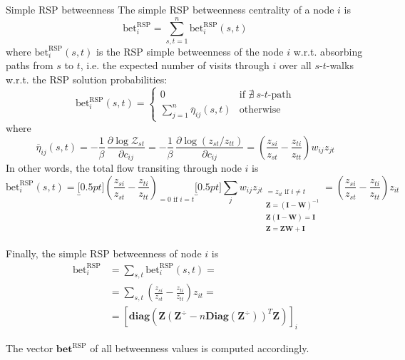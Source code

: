 \documentclass[13pt]{beamer}
\begin{document}
    \begin{frame}[t,allowframebreaks]{Simple RSP betweenness}
    The simple RSP betweenness centrality of a node $i$ is
    \begin{equation*}
    \text{bet}_i^{\text{RSP}}=\sum_{s,t=1}^n \text{bet}_i^{\text{RSP}}(s,t)
    \end{equation*}
    where $\text{bet}_i^{\text{RSP}}(s,t)$ is the RSP simple betweenness of the node $i$ w.r.t. absorbing paths from $s$ to $t$, i.e. the expected number of visits through $i$ over all $s$-$t$-walks w.r.t. the RSP solution probabilities:
    \begin{equation*}
    \text{bet}_i^{\text{RSP}}(s,t)=
    \begin{cases}
    0 &\text{if }\nexists\ s\text{-}t\text{-path}\\
    \displaystyle\sum_{j=1}^n\overline{\eta}_{ij}(s,t) &\text{otherwise}
    \end{cases}
    \end{equation*} 
    where 
    \begin{equation*}
    \overline{\eta}_{ij}(s,t)=-\frac{1}{\beta}\,\frac{\partial\log \mathcal{Z}_{st}}{\partial c_{ij}}=-\frac{1}{\beta}\,\frac{\partial\log\left(z_{st}/z_{tt}\right) }{\partial c_{ij}}=\left(\frac{z_{si}}{z_{st}}-\frac{z_{ti}}{z_{tt}}\right)w_{ij}z_{jt}
    \end{equation*}
    In other words, the total flow transiting through node $i$ is
    \begin{equation*}
    \text{bet}_i^{\text{RSP}}(s,t)=\underbracket[0.5pt]{\left(\frac{z_{si}}{z_{st}}-\frac{z_{ti}}{z_{tt}}\right)}_{=0\text{ if }i=t}\underbracket[0.5pt]{\sum_{j} w_{ij}z_{jt}}_{\begin{gathered}
    \scriptstyle{=z_{it}\text{ if }i\neq t} \\
    \scriptstyle{\mathbf{Z}=(\mathbf{I}-\mathbf{W})^{-1}} \\
    \scriptstyle{\mathbf{Z}(\mathbf{I}-\mathbf{W})=\mathbf{I}} \\
    \scriptstyle{\mathbf{Z}=\mathbf{ZW}+\mathbf{I}} \\
    \end{gathered}}=\left(\frac{z_{si}}{z_{st}}-\frac{z_{ti}}{z_{tt}}\right)z_{it}
    \end{equation*}

    Finally, the simple RSP betweenness of node $i$ is
    \begin{align*}
    \text{bet}_i^{\text{RSP}}&=\sum_{s,t}\text{bet}_i^{\text{RSP}}(s,t)=\\
    &=\sum_{s,t} \left(\frac{z_{si}}{z_{st}}-\frac{z_{ti}}{z_{tt}}\right)z_{it}=\\
    &=\left[ \textbf{diag}\left( \mathbf{Z} \left(\mathbf{Z}^\div-n \textbf{Diag}\left( \mathbf{Z}^\div \right) \right)^T\mathbf{Z} \right) \right]_i
    \end{align*}

    The vector $\textbf{bet}^\text{RSP}$ of all betweenness values is computed accordingly.
    \end{frame}
\end{document}
